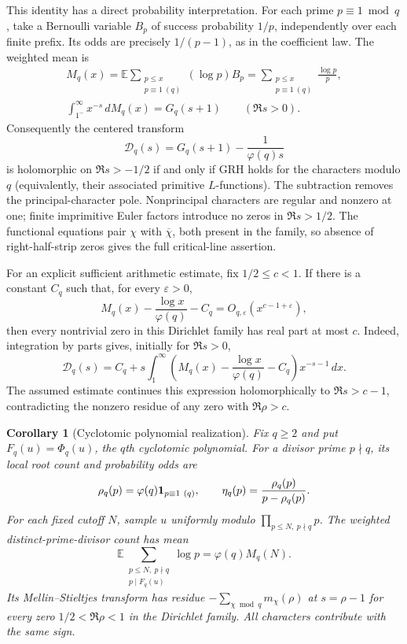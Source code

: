 \documentclass[11pt]{article}
\newtheorem{corollary}[theorem]{Corollary}
\theoremstyle{definition}
\begin{document}
This identity has a direct probability interpretation. For each prime
$p\equiv1\bmod q$, take a Bernoulli variable $B_p$ of success probability
$1/p$, independently over each finite prefix. Its odds are precisely
$1/(p-1)$, as in the coefficient law. The weighted mean is
\[
 \begin{gathered}
 M_q(x)=\mathbb E\!\sum_{\substack{p\le x\\p\equiv1\ (q)}}(\log p)B_p
       =\sum_{\substack{p\le x\\p\equiv1\ (q)}}\frac{\log p}{p},\\
 \int_{1^-}^{\infty}x^{-s}\,dM_q(x)=G_q(s+1)
 \qquad(\Re s>0).
 \end{gathered}
\]
Consequently the centered transform
\[
 \mathcal D_q(s)=G_q(s+1)-\frac1{\varphi(q)s}
\]
is holomorphic on $\Re s>-1/2$ if and only if GRH holds for the characters
modulo $q$ (equivalently, their associated primitive $L$-functions).
The subtraction removes the principal-character pole. Nonprincipal
characters are regular and nonzero at one; finite imprimitive Euler
factors introduce no zeros in $\Re s>1/2$.
The functional equations pair $\chi$ with $\overline\chi$, both present
in the family, so absence of right-half-strip zeros gives the full
critical-line assertion.

For an explicit sufficient arithmetic estimate, fix $1/2\le c<1$.
If there is a constant $C_q$ such that, for every $\varepsilon>0$,
\[
 M_q(x)-\frac{\log x}{\varphi(q)}-C_q
       =O_{q,\varepsilon}(x^{c-1+\varepsilon}),
\]
then every nontrivial zero in this Dirichlet family has real part at most
$c$. Indeed, integration by parts gives, initially for $\Re s>0$,
\[
 \mathcal D_q(s)
  =C_q+s\int_1^\infty
     \left(M_q(x)-\frac{\log x}{\varphi(q)}-C_q\right)x^{-s-1}\,dx.
\]
The assumed estimate continues this expression holomorphically to
$\Re s>c-1$, contradicting the nonzero residue of any zero with
$\Re\rho>c$.

\begin{corollary}[Cyclotomic polynomial realization]
\label{cor:cyclotomic-class-observable}
Fix $q\ge2$ and put $F_q(u)=\Phi_q(u)$, the $q$th cyclotomic polynomial.
For a divisor prime $p\nmid q$, its local root count and probability odds are
\[
 \rho_q(p)=\varphi(q){\bf1}_{p\equiv1\ (q)},\qquad
 \eta_q(p)=\frac{\rho_q(p)}{p-\rho_q(p)}.
\]
For each fixed cutoff $N$, sample $u$ uniformly modulo
$\prod_{p\le N,\ p\nmid q}p$. The weighted distinct-prime-divisor count has mean
\[
 \mathbb E\!\sum_{\substack{p\le N,\ p\nmid q\\p\mid F_q(u)}}\log p
    =\varphi(q)M_q(N).
\]
Its Mellin--Stieltjes transform has residue
$-\sum_{\chi\bmod q}m_\chi(\rho)$ at $s=\rho-1$ for every zero
$1/2<\Re\rho<1$ in the Dirichlet family. All characters contribute with
the same sign.
\end{corollary}
\end{document}
